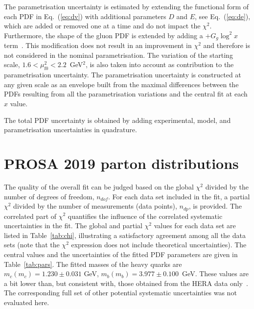 The parametrisation uncertainty is estimated by extending the functional form of each PDF in Eq.~(\ref{eq:dv}) with additional parameters $D$ and $E$, see Eq.~(\ref{eq:de}), 
which are added or removed one at a time and do not impact the $\chi^2$. 
Furthermore, the shape of the gluon PDF is extended by adding a $+G_g\log^2 x$ term~\cite{Bonvini:2019wxf}. This modification does not result in an improvement in $\chi^2$ and therefore is not considered in the nominal parametrisation. 
The variation of the starting scale, $1.6 < \mu_\mathrm{f0}^2 < 2.2$~GeV$^2$, is also taken into account as contribution to the parametrisation uncertainty. The parametrisation uncertainty is constructed at any given scale as an envelope built from the maximal differences between the PDFs resulting from all the parametrisation variations and the central fit at each $x$ value.

The total PDF uncertainty is obtained by adding experimental, model, and parametrisation  uncertainties in quadrature.


%
%
%


\section{PROSA 2019 parton distributions}
\label{sec:results}

The quality of the overall fit can be judged based on the global $\chi^2$ divided by the number of degrees of freedom, $n_{dof}$. For each data set included in the fit, a partial $\chi^2$
divided by the number of measurements (data points), $n_{dp}$, is provided. The correlated part of $\chi^2$ quantifies the influence of the correlated systematic uncertainties in the fit. The global and partial $\chi^2$ values for each data set are listed in Table~\ref{tab:chi}, {\color{blue}illustrating a satisfactory agreement among all the data sets (note that the $\chi^2$ expression does not include theoretical uncertainties)}. The central values and the uncertainties of the fitted PDF parameters are given in Table~\ref{tab:pars}. 
The fitted masses of the heavy quarks are $m_c(m_c) = 1.230 \pm 0.031$ GeV, $m_b(m_b) = 3.977 \pm 0.100$~GeV. These values are a bit lower than, but consistent with, those obtained from the HERA data only~\cite{H1:2018flt}.
The corresponding full set of other potential systematic uncertainties was not evaluated here.


